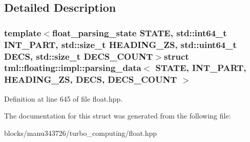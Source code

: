 \subsection{Detailed Description}
\subsubsection*{template$<$float\+\_\+parsing\+\_\+state S\+T\+A\+T\+E, std\+::int64\+\_\+t I\+N\+T\+\_\+\+P\+A\+R\+T, std\+::size\+\_\+t H\+E\+A\+D\+I\+N\+G\+\_\+\+Z\+S, std\+::uint64\+\_\+t D\+E\+C\+S, std\+::size\+\_\+t D\+E\+C\+S\+\_\+\+C\+O\+U\+N\+T$>$struct tml\+::floating\+::impl\+::parsing\+\_\+data$<$ S\+T\+A\+T\+E, I\+N\+T\+\_\+\+P\+A\+R\+T, H\+E\+A\+D\+I\+N\+G\+\_\+\+Z\+S, D\+E\+C\+S, D\+E\+C\+S\+\_\+\+C\+O\+U\+N\+T $>$}



Definition at line 645 of file float.\+hpp.



The documentation for this struct was generated from the following file\+:\begin{DoxyCompactItemize}
\item 
blocks/manu343726/turbo\+\_\+computing/float.\+hpp\end{DoxyCompactItemize}
